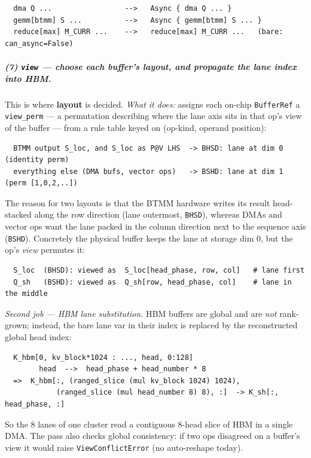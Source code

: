 \documentclass[
  10pt,
]{article}
\begin{document}
\begin{verbatim}
  dma Q ...                 -->   Async { dma Q ... }
  gemm[btmm] S ...          -->   Async { gemm[btmm] S ... }
  reduce[max] M_CURR ...    -->   reduce[max] M_CURR ...   (bare: can_async=False)
\end{verbatim}

\subparagraph{(7) \texttt{view} --- choose each buffer's layout, and
propagate the lane index into HBM.}\label{fa-view} This is where
\textbf{layout} is decided. \emph{What it does:} assigns each on-chip
\texttt{BufferRef} a \texttt{view\_perm} --- a permutation describing
where the lane axis sits in that op's view of the buffer --- from a rule
table keyed on (op-kind, operand position):

\begin{verbatim}
  BTMM output S_loc, and S_loc as P@V LHS  -> BHSD: lane at dim 0  (identity perm)
  everything else (DMA bufs, vector ops)   -> BSHD: lane at dim 1  (perm [1,0,2,..])
\end{verbatim}

The reason for two layouts is that the BTMM hardware writes its result
head-stacked along the row direction (lane outermost, \texttt{BHSD}),
whereas DMAs and vector ops want the lane packed in the column direction
next to the sequence axis (\texttt{BSHD}). Concretely the physical buffer
keeps the lane at storage dim 0, but the op's \emph{view} permutes it:

\begin{verbatim}
  S_loc  (BHSD): viewed as  S_loc[head_phase, row, col]   # lane first
  Q_sh   (BSHD): viewed as  Q_sh[row, head_phase, col]    # lane in the middle
\end{verbatim}

\emph{Second job --- HBM lane substitution.} HBM buffers are global and
are \emph{not} rank-grown; instead, the bare lane var in their index is
replaced by the reconstructed global head index:

\begin{verbatim}
  K_hbm[0, kv_block*1024 : ..., head, 0:128]
        head  -->  head_phase + head_number * 8
  =>  K_hbm[:, (ranged_slice (mul kv_block 1024) 1024),
            (ranged_slice (mul head_number 8) 8), :]  -> K_sh[:, head_phase, :]
\end{verbatim}

So the 8 lanes of one cluster read a contiguous 8-head slice of HBM in a
single DMA. The pass also checks global consistency: if two ops disagreed
on a buffer's view it would raise \texttt{ViewConflictError} (no
auto-reshape today).
\end{document}
